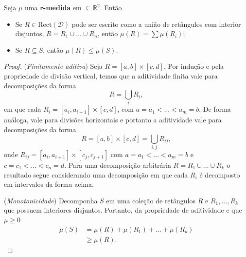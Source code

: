 \begin{propo}
    Seja $\mu$ uma \textbf{r-medida} em $\mathcal \subseteq \mathbb{R}^2$. Então 
    \begin{itemize}
        \item Se $R \in \text{Rect}(\mathcal{D})$ pode ser escrito como a união de retângulos com interior
        disjuntos, $R = R_1 \cup \dots \cup R_n$, então $\mu(R) = \sum \mu(R_i)$;
        \item Se $R \subseteq S$, então $\mu(R) \leq \mu(S)$.
    \end{itemize}    
\end{propo}
\begin{proof}
    (\textit{Finitamente aditiva}) Seja $R = [a,b] \times [c,d]$. Por indução e pela propriedade de divisão
    vertical, temos que a aditividade finita vale para decomposições da forma 
    \begin{equation*}
        R = \bigcup_i R_i,
    \end{equation*}
    em que cada $R_i = [a_i, a_{i+1}] \times [c,d]$, com $a = a_1 < \dots < a_m = b$. De forma análoga,
    vale para divisões horizontais e portanto a aditividade vale para decomposições da forma
    \begin{equation*}
        R = [a,b] \times [c,d] = \bigcup_{i,j} R_{ij},
    \end{equation*}
    onde $R_{ij} = [a_i, a_{i+1}] \times [c_j, c_{j+1}]$ com $a = a_1 < \dots < a_m = b$ e $c = c_1 < 
    \dots < c_n = d$. Para uma decomposição arbitrária $R = R_1 \cup \dots \cup R_k$ o resultado segue
    considerando uma decomposição em que cada $R_i$ é decomposto em intervalos da forma acima.  

    (\textit{Monotonicidade}) Decomponha $S$ em uma coleção de retângulos $R$ e $R_1, \dots, R_k$ que 
    possuem interiores disjuntos. Portanto, da propriedade de aditividade e que $\mu \geq 0$
    \begin{align*}
        \mu(S) & = \mu(R) + \mu(R_1) + \dots + \mu(R_k) \\
               & \geq \mu(R).
    \end{align*}
\end{proof}

